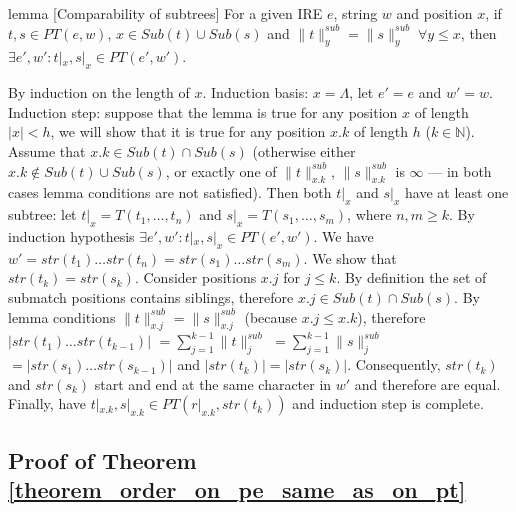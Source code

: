 \documentclass[AMA,STIX1COL]{WileyNJD-v2}
\newcommand{\YN}{\mathbb{N}}
\newcommand{\PT}{PT}
\newcommand{\snorm}[2]{\|{#1}\|^{sub}_{#2}}
\begin{document}
\begin{theoremEnd}{lemma}
[Comparability of subtrees]
    \label{lemma_subtrees}
    For a given IRE $e$, string $w$ and position $x$,
    if $t, s \in \PT(e, w)$, $x \in Sub(t) \cup Sub(s)$ and $\snorm{t}{y} = \snorm{s}{y} \; \forall y \leq x$,
    then $\exists e', w' : t|_x, s|_x \in \PT(e', w')$.
\end{theoremEnd}
\begin{proofEnd}
    By induction on the length of $x$.
    Induction basis: $x = \Lambda$, let $e' = e$ and $w' = w$.
    Induction step: suppose that the lemma is true for any position $x$ of length
    $|x| < h$, we will show that it is true for any position $x.k$ of length $h$
    ($k \in \YN$).
    Assume that $x.k \in Sub(t) \cap Sub(s)$
    (otherwise either $x.k \not\in Sub(t) \cup Sub(s)$,
    or exactly one of $\snorm{t}{x.k}$, $\snorm{s}{x.k}$ is $\infty$ --- in both
    cases lemma conditions are not satisfied).
    Then both $t|_x$ and $s|_x$ have at least one subtree: let
    $t|_{x} = T(t_1, \dots, t_n)$ and
    $s|_{x} = T(s_1, \dots, s_m)$, where $n, m \geq k$.
    By induction hypothesis $\exists e', w' : t|_x, s|_x \in \PT(e', w')$.
    We have $w' = str(t_1) \dots str(t_n) = str(s_1) \dots str(s_m)$.
    We show that $str(t_k) = str(s_k)$.
    Consider positions $x.j$ for $j \leq k$.
    By definition the set of submatch positions contains siblings,
    therefore $x.j \in Sub(t) \cap Sub(s)$.
    By lemma conditions $\snorm{t}{x.j} = \snorm{s}{x.j}$ (because $x.j \leq x.k$),
    therefore $|str(t_1) \dots str(t_{k-1})|$
    $= \sum\nolimits_{j=1}^{k-1}\snorm{t}{j}$
    $= \sum\nolimits_{j=1}^{k-1}\snorm{s}{j}$
    $= |str(s_1) \dots str(s_{k-1})|$ and
    $|str(t_k)| = |str(s_k)|$.
    Consequently, $str(t_k)$ and $str(s_k)$ start and end at the same character in $w'$ and therefore are equal.
    Finally, have $t|_{x.k}, s|_{x.k} \in \PT(r|_{x.k}, str(t_k))$ and induction step is complete.
\end{proofEnd}



\subsection*{Proof of Theorem \ref{theorem_order_on_pe_same_as_on_pt}}
\end{document}
